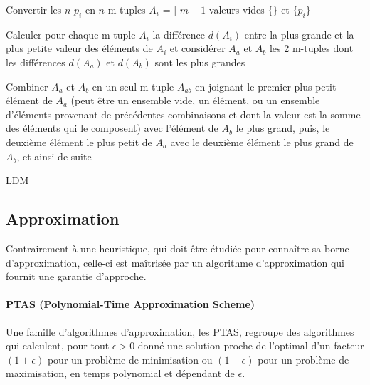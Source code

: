\documentclass[a4paper,12pt]{report}
\theoremstyle{plain}				%
\theoremstyle{definition}				%
\begin{document}
\bigskip  
\begin{algorithm}[H]
\DontPrintSemicolon
{}

\BlankLine %
Convertir les $n$ $p_i$ en $n$ m-tuples $A_i$ = [ $m-1$ valeurs vides $\{\}$ et $\{p_i\}$] 

{
Calculer pour chaque m-tuple $A_i$ la différence $d(A_i)$ 
  entre la plus grande et la plus petite valeur des éléments de $A_i$ et
  considérer $A_a$ et $A_b$ les 2 m-tuples dont les différences 
  $d(A_a)$ et $d(A_b)$ sont les plus grandes

Combiner $A_a$ et $A_b$ en un seul m-tuple $A_{ab}$ en joignant 
  le premier plus petit élément de $A_a$ 
  (peut être un ensemble vide, 
  un élément, 
  ou un ensemble d'éléments provenant de précédentes combinaisons et 
  dont la valeur est la somme des éléments qui le composent)
  avec l'élément de $A_b$ le plus grand, 
  puis,
  le deuxième élément le plus petit de $A_a$ avec le deuxième élément le plus grand de $A_b$,
  et ainsi de suite 
}
\caption{LDM}
\label{algo:LDM}
\end{algorithm}

\subsection{Approximation}\label{ssec:Approximation}
Contrairement à une heuristique, qui doit être étudiée pour connaître sa borne d'approximation, 
  celle-ci est maîtrisée par un algorithme d'approximation qui fournit une garantie d'approche.

\paragraph{PTAS (Polynomial-Time Approximation Scheme)}
Une famille d'algorithmes d'approximation, les PTAS,   
  regroupe des algorithmes qui calculent, pour tout $\epsilon > 0$ donné 
  une solution proche de l'optimal 
  d'un facteur $(1 + \epsilon)$ pour un problème de minimisation 
  ou $(1 - \epsilon)$ pour un problème de maximisation, 
  en temps polynomial et dépendant de $\epsilon$. 
\end{document}
